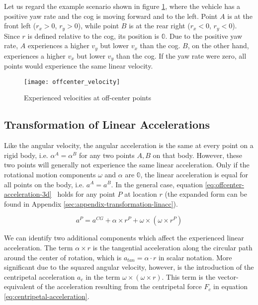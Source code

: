 Let us regard the example scenario shown in figure \ref{fig:offcenter-velocity}, where the vehicle has a positive yaw rate and the \gls{cog} is moving forward and to the left. Point $A$ is at the front left ($r_x > 0$, $r_y > 0$), while point $B$ is at the rear right ($r_x < 0$, $r_y < 0$). Since $r$ is defined relative to the \gls{cog}, its position is $\mathbb{0}$. Due to the positive yaw rate, $A$ experiences a higher $v_y$ but lower $v_x$ than the \gls{cog}. $B$, on the other hand, experiences a higher $v_x$ but lower $v_y$ than the \gls{cog}. If the yaw rate were zero, all points would experience the same linear velocity.

\begin{figure}
	\centering
	\texttt{[image: offcenter\_velocity]}%
	\caption{Experienced velocities at off-center points}
	\label{fig:offcenter-velocity}
\end{figure}


\subsection{Transformation of Linear Accelerations}
Like the angular velocity, the angular acceleration is the same at every point on a rigid body, i.e. $\alpha^A = \alpha^B$ for any two points $A, B$ on that body. However, these two points will generally not experience the same linear acceleration. Only if the rotational motion components $\omega$ and $\alpha$ are $\mathbb{0}$, the linear acceleration is equal for all points on the body, i.e. $a^A = a^B$. In the general case, equation \ref{eq:offcenter-acceleration-3d}~\cite[p.~140]{Gross.2014} holds for any point $P$ at location $r$ (the expanded form can be found in Appendix \ref{sec:appendix-transformation-linacc}).

\begin{equation}\label{eq:offcenter-acceleration-3d}%
a^P = a^{CG} + \alpha \times r^P + \omega \times (\omega \times r^P)%
\end{equation}

We can identify two additional components which affect the experienced linear acceleration. The term $\alpha \times r$ is the tangential acceleration along the circular path around the center of rotation, which is $a_{tan} = \alpha \cdot r$ in scalar notation. More significant due to the squared angular velocity, however, is the introduction of the centripetal acceleration $a_c$ in the term $\omega \times (\omega \times r)$. This term is the vector-equivalent of the acceleration resulting from the centripetal force $F_c$ in equation \ref{eq:centripetal-acceleration}.

